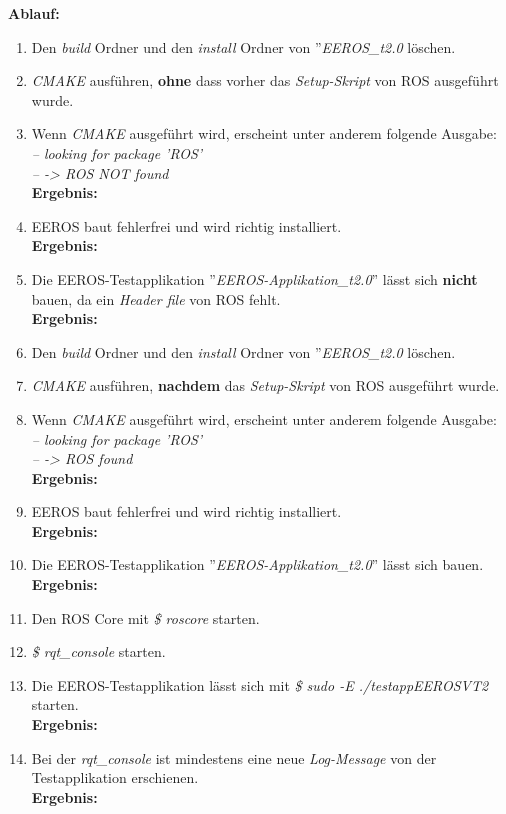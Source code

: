 \textbf{Ablauf: } 
\begin{enumerate}
\item Den \textit{build} Ordner und den \textit{install} Ordner von ''\textit{EEROS\_t2.0} löschen.
\item \textit{CMAKE} ausführen, \textbf{ohne} dass vorher das \textit{Setup-Skript} von ROS ausgeführt wurde.
\item Wenn \textit{CMAKE} ausgeführt wird, erscheint unter anderem folgende Ausgabe: \\
\textit{-- looking for package 'ROS' \\
-- -> ROS NOT found} \\
\textbf{Ergebnis:} \checkmark
\item EEROS baut fehlerfrei und wird richtig installiert. \\
\textbf{Ergebnis:} \checkmark
\item Die EEROS-Testapplikation ''\textit{EEROS-Applikation\_t2.0}'' lässt sich \textbf{nicht} bauen, da ein \textit{Header file} von ROS fehlt. \\
\textbf{Ergebnis:} \checkmark
\item Den \textit{build} Ordner und den \textit{install} Ordner von ''\textit{EEROS\_t2.0} löschen.
\item \textit{CMAKE} ausführen, \textbf{nachdem} das \textit{Setup-Skript} von ROS ausgeführt wurde.
\item Wenn \textit{CMAKE} ausgeführt wird, erscheint unter anderem folgende Ausgabe: \\
\textit{-- looking for package 'ROS' \\
-- -> ROS found} \\
\textbf{Ergebnis:} \checkmark
\item EEROS baut fehlerfrei und wird richtig installiert. \\
\textbf{Ergebnis:} \checkmark
\item Die EEROS-Testapplikation ''\textit{EEROS-Applikation\_t2.0}'' lässt sich bauen. \\
\textbf{Ergebnis:} \checkmark
\item Den ROS Core mit \textit{\$ roscore} starten.
\item \textit{\$ rqt\_console} starten.
\item Die EEROS-Testapplikation lässt sich mit \textit{\$ sudo -E ./testappEEROSVT2 } starten. \\
\textbf{Ergebnis:} \checkmark
\item Bei der \textit{rqt\_console} ist mindestens eine neue \textit{Log-Message} von der Testapplikation erschienen. \\
\textbf{Ergebnis:} \checkmark
\end{enumerate}




